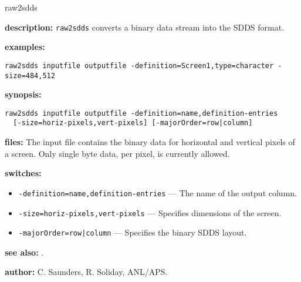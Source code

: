 \begin{sddsprog}{raw2sdds}
  \item \textbf{description:}
  \verb|raw2sdds| converts a binary data stream into the SDDS format.
  \item \textbf{examples:}
\begin{verbatim}
raw2sdds inputfile outputfile -definition=Screen1,type=character -size=484,512
\end{verbatim}
  \item \textbf{synopsis:}
\begin{verbatim}
raw2sdds inputfile outputfile -definition=name,definition-entries
  [-size=horiz-pixels,vert-pixels] [-majorOrder=row|column]
\end{verbatim}
  \item \textbf{files:}
  The input file contains the binary data for horizontal and vertical pixels of a screen.
  Only single byte data, per pixel, is currently allowed.
  \item \textbf{switches:}
    \begin{itemize}
      \item \verb|-definition=name,definition-entries| --- The name of the output column.
      \item \verb|-size=horiz-pixels,vert-pixels| --- Specifies dimensions of the screen.
      \item \verb!-majorOrder=row|column! --- Specifies the binary SDDS layout.
    \end{itemize}
  \item \textbf{see also:} .
  \item \textbf{author:} C. Saunders, R. Soliday, ANL/APS.
\end{sddsprog}
 
